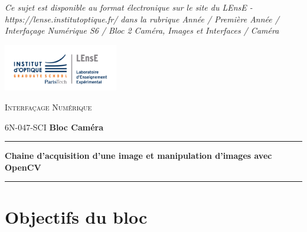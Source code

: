 \documentclass[a4paper,11pt,titlepage]{article} %
\begin{document}
\begin{titlepage}
\begin{center}
\bigskip

\vfill

\textit{Ce sujet est disponible au format électronique sur le site du LEnsE - https://lense.institutoptique.fr/ dans la rubrique Année / Première Année / Interfaçage Numérique S6 / Bloc 2 Caméra, Images et Interfaces / Caméra}


\end{center}
\end{titlepage}

\newpage
\strut %


\newpage
\pagestyle{empty}

\begin{minipage}[c]{.25\linewidth}
	\includegraphics[width=5cm]{images/Logo-LEnsE.png}
\end{minipage} \hfill
\begin{minipage}[c]{.4\linewidth}

\begin{center}
\vspace{0.3cm}
{\Large \textsc{Interfaçage Numérique}}

\medskip

6N-047-SCI \qquad \textbf{\Large Bloc Caméra}

\end{center}
\end{minipage}\hfill

\vspace{0.5cm}

\noindent \rule{\linewidth}{1pt}

{\noindent\Large  \rule[-7pt]{0pt}{30pt} \textbf{Chaine d'acquisition d'une image et manipulation d'images avec OpenCV}}

\noindent \rule{\linewidth}{1pt}

\bigskip


\section{Objectifs du bloc}
\end{document}
